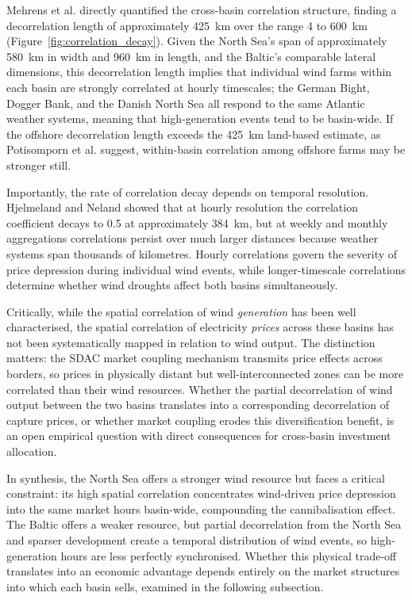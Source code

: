 Mehrens et al. \cite{Mehrens2016} directly quantified the cross-basin correlation structure, finding a decorrelation length of approximately 425~km over the range 4 to 600~km (Figure~\ref{fig:correlation_decay}). Given the North Sea's span of approximately 580~km in width and 960~km in length, and the Baltic's comparable lateral dimensions, this decorrelation length implies that individual wind farms within each basin are strongly correlated at hourly timescales; the German Bight, Dogger Bank, and the Danish North Sea all respond to the same Atlantic weather systems, meaning that high-generation events tend to be basin-wide. If the offshore decorrelation length exceeds the 425~km land-based estimate, as Potisomporn et al. \cite{Potisomporn2022} suggest, within-basin correlation among offshore farms may be stronger still.

\vspace{4pt}

Importantly, the rate of correlation decay depends on temporal resolution. Hjelmeland and Neland \cite{Hjelmeland2023} showed that at hourly resolution the correlation coefficient decays to 0.5 at approximately 384~km, but at weekly and monthly aggregations correlations persist over much larger distances because weather systems span thousands of kilometres. Hourly correlations govern the severity of price depression during individual wind events, while longer-timescale correlations determine whether wind droughts affect both basins simultaneously.

\vspace{4pt}

Critically, while the spatial correlation of wind \textit{generation} has been well characterised, the spatial correlation of electricity \textit{prices} across these basins has not been systematically mapped in relation to wind output. The distinction matters: the SDAC market coupling mechanism transmits price effects across borders, so prices in physically distant but well-interconnected zones can be more correlated than their wind resources. Whether the partial decorrelation of wind output between the two basins translates into a corresponding decorrelation of capture prices, or whether market coupling erodes this diversification benefit, is an open empirical question with direct consequences for cross-basin investment allocation.

\vspace{4pt}

In synthesis, the North Sea offers a stronger wind resource but faces a critical constraint: its high spatial correlation concentrates wind-driven price depression into the same market hours basin-wide, compounding the cannibalisation effect. The Baltic offers a weaker resource, but partial decorrelation from the North Sea and sparser development create a temporal distribution of wind events, so high-generation hours are less perfectly synchronised. Whether this physical trade-off translates into an economic advantage depends entirely on the market structures into which each basin sells, examined in the following subsection.

